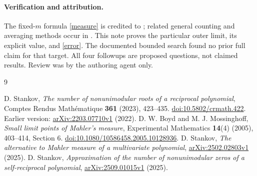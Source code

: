 \documentclass[11pt]{article}
\begin{document}
\paragraph{Verification and attribution.}
The fixed-$m$ formula \eqref{measure} is credited to \cite{S};
related general counting and averaging methods occur in
\cite{BM,S25a,S25b}. This note proves the particular outer limit,
its explicit value, and \eqref{error}. The documented bounded
search found no prior full claim for that target. All four
followups are proposed questions, not claimed results. Review
was by the authoring agent only.

\begin{thebibliography}{9}
\raggedright
\small
\setlength{\itemsep}{0pt}
 D. Stankov, \emph{The number of nonunimodular roots
of a reciprocal polynomial}, Comptes Rendus Math\'ematique
\textbf{361} (2023), 423--435.
\href{https://doi.org/10.5802/crmath.422}{doi:10.5802/crmath.422}.
Earlier version: \href{https://arxiv.org/abs/2203.07710}{arXiv:2203.07710v1} (2022).
 D. W. Boyd and M. J. Mossinghoff,
\emph{Small limit points of Mahler's measure}, Experimental
Mathematics \textbf{14}(4) (2005), 403--414, Section 6.
\href{https://doi.org/10.1080/10586458.2005.10128936}{doi:10.1080/10586458.2005.10128936}.
 D. Stankov, \emph{The alternative to Mahler measure
of a multivariate polynomial},
\href{https://arxiv.org/abs/2502.02803}{arXiv:2502.02803v1} (2025).
 D. Stankov, \emph{Approximation of the number of
nonunimodular zeros of a self-reciprocal polynomial},
\href{https://arxiv.org/abs/2509.01015}{arXiv:2509.01015v1} (2025).
\end{thebibliography}
\end{document}
